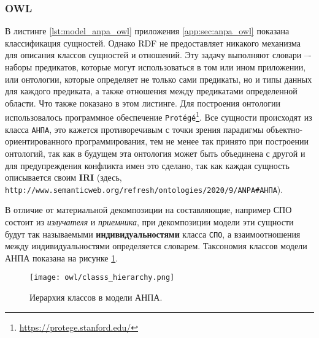 \subsubsection{OWL}
В листинге \ref{lst:model_anpa_owl} приложения \ref{app:sec:anpa_owl} показана
классификация сущностей.
Однако RDF не предоставляет никакого механизма для описания классов сущностей и
отношений. Эту задачу выполняют словари –- наборы предикатов, которые могут
использоваться в том или ином приложении, или онтологии, которые определяет не только
сами предикаты, но и типы данных для каждого предиката, а также отношения между
предикатами определенной области.
Что также показано в этом листинге.
Для построения онтологии использовалось программное обеспечение
\texttt{Protégé}\footnote{\url{https://protege.stanford.edu/}}.
Все сущности происходят из класса \texttt{АНПА}, это кажется противоречивым с точки зрения парадигмы объектно-ориентированного программирования,
тем не менее так принято при построении онтологий, так как в будущем эта онтология может быть объединена с другой
и для предупреждения конфликта имен это сделано, так как каждая сущность описывается своим \textbf{IRI}
(здесь, \texttt{http://www.semanticweb.org/refresh/ontologies/2020/9/ANPA#АНПА}).

В отличие от материальной декомпозиции на составляющие, например СПО состоит из \textit{излучателя} и \textit{приемника},
при декомпозиции модели эти сущности будут так называемыми \textbf{индивидуальностями} класса \texttt{СПО},
а взаимоотношения между индивидуальностями определяется словарем.
Таксономия классов модели АНПА показана на рисунке \ref{fig:owl_classs_hierarchy}.
\begin{center}
    \begin{figure}[ht!]
        \texttt{[image: owl/classs\_hierarchy.png]}
        \caption{Иерархия классов в модели АНПА.}\label{fig:owl_classs_hierarchy}
    \end{figure}
\end{center}

